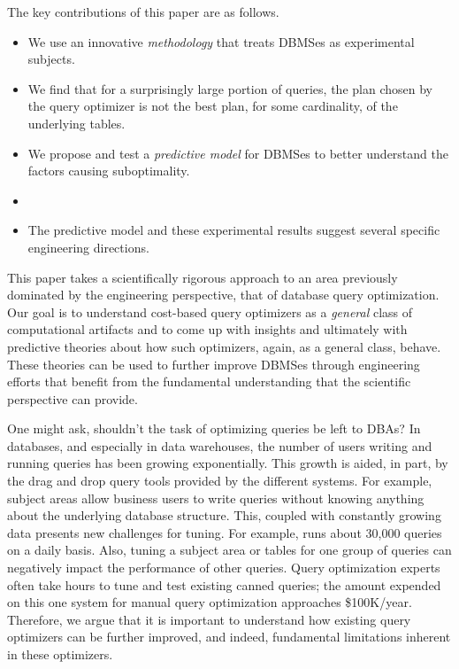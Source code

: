 \documentclass[prodmode,acmtods]{acmsmall}
\begin{document}
\pagebreak
The key contributions of this paper are as follows.
\begin{itemize} 
\item We use an innovative {\em methodology} that treats \hbox{DBMSes} as experimental subjects.

\item We find that for a surprisingly large portion of queries, the plan
  chosen  by the query optimizer is not the best plan, for some cardinality,
  of the underlying tables.

\item We propose and test a {\em predictive model} for \hbox{DBMSes} to better understand the factors causing suboptimality.

\item {}

\item The predictive model and these experimental results suggest several specific
  engineering directions.
\end{itemize}

This paper takes a scientifically rigorous approach to an
area previously dominated by the engineering perspective, that of database
query optimization.  Our goal is to \hbox{understand} cost-based query optimizers
as a {\em general} class of computational artifacts and to come up with
insights and ultimately with predictive theories about how such optimizers,
again, as a general class, behave.  These theories can be used to further
improve \hbox{DBMSes} through engineering \hbox{efforts} that benefit from the fundamental
understanding that the scientific perspective can provide.

One might ask, shouldn't the task of optimizing queries be left to DBAs?  In
databases, and especially in data warehouses, the number of users writing
and running queries has been growing exponentially. This growth is aided, in
part, by the drag and drop query tools provided by the different
systems. For example, subject areas allow business users to write queries
without knowing anything about the underlying database structure. This,
coupled with constantly growing data presents new challenges for tuning. For
example,  runs about
30,000 queries on a daily basis. 
Also, tuning a subject area or tables for one group of queries can
negatively impact the performance of other queries. Query optimization experts often take hours to tune and test existing canned
queries; the amount expended on this one system for manual query optimization
approaches \$100K/year. Therefore, we argue that it is important to
understand how existing query optimizers can be further improved, and
indeed, fundamental limitations inherent in these optimizers.
\end{document}
